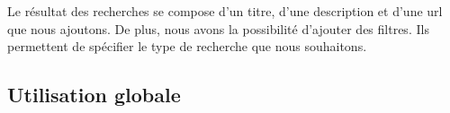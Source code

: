 Le résultat des recherches se compose d'un titre, d'une description et d'une url que nous ajoutons. De plus, nous avons la possibilité d'ajouter des filtres.
Ils permettent de spécifier le type de recherche que nous souhaitons.


\subsection {Utilisation globale}

